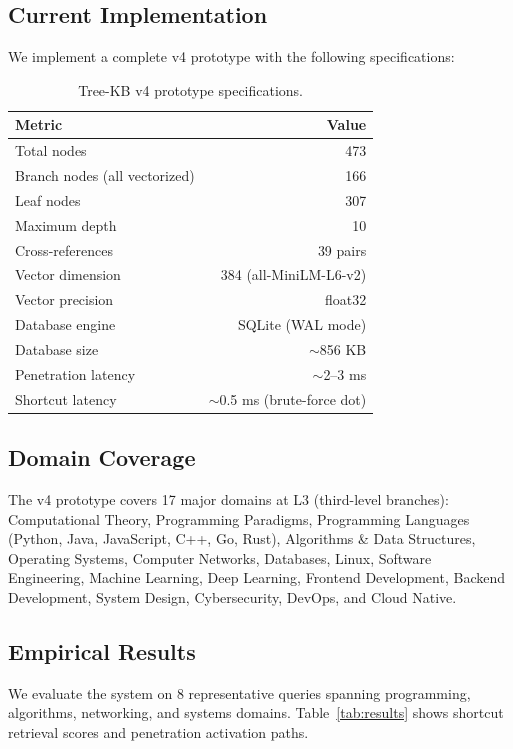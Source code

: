 \documentclass[11pt,a4paper]{article}
\begin{document}
\subsection{Current Implementation}

We implement a complete v4 prototype with the following specifications:

\begin{table}[H]
\centering
\caption{Tree-KB v4 prototype specifications.}
\label{tab:specs}
\begin{tabular}{lr}
\toprule
\textbf{Metric} & \textbf{Value} \\
\midrule
Total nodes & 473 \\
Branch nodes (all vectorized) & 166 \\
Leaf nodes & 307 \\
Maximum depth & 10 \\
Cross-references & 39 pairs \\
Vector dimension & 384 (all-MiniLM-L6-v2) \\
Vector precision & float32 \\
Database engine & SQLite (WAL mode) \\
Database size & $\sim$856 KB \\
Penetration latency & $\sim$2--3 ms \\
Shortcut latency & $\sim$0.5 ms (brute-force dot) \\
\bottomrule
\end{tabular}
\end{table}

\subsection{Domain Coverage}

The v4 prototype covers 17 major domains at L3 (third-level branches): Computational Theory, Programming Paradigms, Programming Languages (Python, Java, JavaScript, C++, Go, Rust), Algorithms \& Data Structures, Operating Systems, Computer Networks, Databases, Linux, Software Engineering, Machine Learning, Deep Learning, Frontend Development, Backend Development, System Design, Cybersecurity, DevOps, and Cloud Native.

\subsection{Empirical Results}

We evaluate the system on 8 representative queries spanning programming, algorithms, networking, and systems domains. Table~\ref{tab:results} shows shortcut retrieval scores and penetration activation paths.
\end{document}
